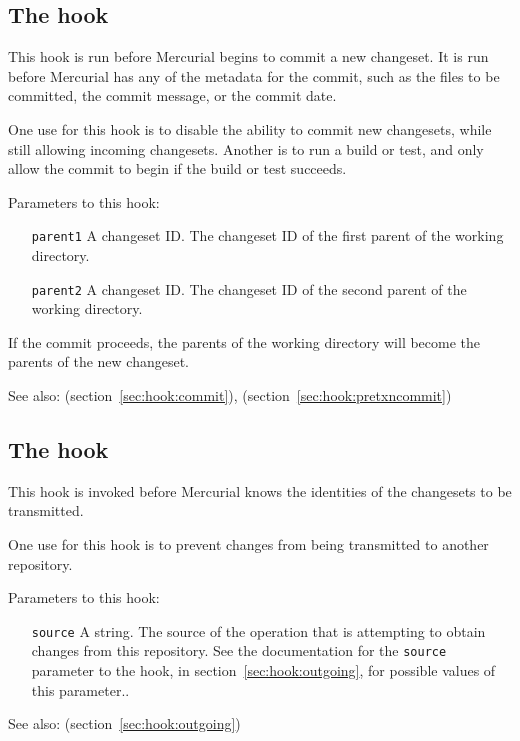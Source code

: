 \subsection{The  hook}
\label{sec:hook:precommit}

This hook is run before Mercurial begins to commit a new changeset.
It is run before Mercurial has any of the metadata for the commit,
such as the files to be committed, the commit message, or the commit
date.

One use for this hook is to disable the ability to commit new
changesets, while still allowing incoming changesets.  Another is to
run a build or test, and only allow the commit to begin if the build
or test succeeds.

Parameters to this hook:
\begin{itemize}
\item[\texttt{parent1}] A changeset ID.  The changeset ID of the first
  parent of the working directory.
\item[\texttt{parent2}] A changeset ID.  The changeset ID of the second
  parent of the working directory.
\end{itemize}
If the commit proceeds, the parents of the working directory will
become the parents of the new changeset.

See also:  (section~\ref{sec:hook:commit}),
 (section~\ref{sec:hook:pretxncommit})

\subsection{The  hook}
\label{sec:hook:preoutgoing}

This hook is invoked before Mercurial knows the identities of the
changesets to be transmitted.

One use for this hook is to prevent changes from being transmitted to
another repository.

Parameters to this hook:
\begin{itemize}
\item[\texttt{source}] A string.  The source of the operation that is
  attempting to obtain changes from this repository.  See the
  documentation for the \texttt{source} parameter to the
   hook, in section~\ref{sec:hook:outgoing}, for
  possible values of this parameter..
\end{itemize}

See also:  (section~\ref{sec:hook:outgoing})

